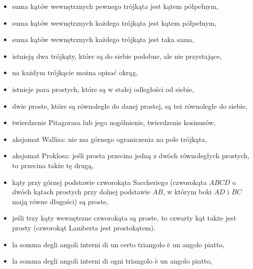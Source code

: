 \begin{itemize}
    \item suma kątów wewnętrznych pewnego trójkąta jest kątem półpełnym,%
    \item suma kątów wewnętrznych każdego trójkąta jest kątem półpełnym,%
    \item suma kątów wewnętrznych każdego trójkąta jest taka sama,%
    \item istnieją dwa trójkąty, które są do siebie podobne, ale nie przystające,%
    \item na każdym trójkącie można opisać okrąg,%
    \item istnieje para prostych, które są w stałej odległości od siebie, %
    \item dwie proste, które są równoległe do danej prostej, są też równoległe do siebie,%
    \item twierdzenie Pitagorasa lub jego uogólnienie, twierdzenie kosinusów,%
    \item aksjomat Wallisa: nie ma górnego ograniczenia na pole trójkąta,%
    \item aksjomat Proklosa: jeśli prosta przecina jedną z dwóch równoległych prostych, to przecina także tę drugą,%
    \item kąty przy górnej podstawie czworokąta Saccheriego (czworokąta $ABCD$ o dwóch kątach prostych przy dolnej podstawie $AB$, w którym boki $AD$ i $BC$ mają równe długości) są proste,%
    \item jeśli trzy kąty wewnętrzne czworokąta są proste, to czwarty kąt także jest prosty (czworokąt Lamberta jest prostokątem).%
    \item la somma degli angoli interni di un certo triangolo è un angolo piatto,%
    \item la somma degli angoli interni di ogni triangolo è un angolo piatto,%

\end{itemize}
